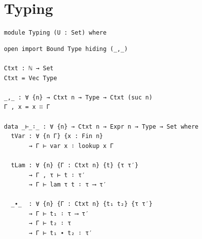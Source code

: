 \documentclass[10pt, xetex, hyperref={pdfpagelabels=false}]{beamer}
\begin{document}
\section{Typing}
\begin{frame}[fragile]{\texttt{module Typing (U : Set) where}}
\begin{verbatim}
open import Bound Type hiding (_,_)

Ctxt : ℕ → Set
Ctxt = Vec Type

_,_ : ∀ {n} → Ctxt n → Type → Ctxt (suc n)
Γ , x = x ∷ Γ

data _⊢_∶_ : ∀ {n} → Ctxt n → Expr n → Type → Set where
  tVar : ∀ {n Γ} {x : Fin n}
       → Γ ⊢ var x ∶ lookup x Γ

  tLam : ∀ {n} {Γ : Ctxt n} {t} {τ τ′}
       → Γ , τ ⊢ t ∶ τ′
       → Γ ⊢ lam τ t ∶ τ ⟶ τ′

  _∙_  : ∀ {n} {Γ : Ctxt n} {t₁ t₂} {τ τ′}
       → Γ ⊢ t₁ ∶ τ ⟶ τ′
       → Γ ⊢ t₂ ∶ τ
       → Γ ⊢ t₁ ∙ t₂ ∶ τ′
\end{verbatim}
\end{frame}

\end{document}
